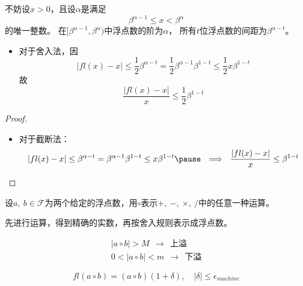 \begin{frame}\ft{\secname}

\begin{zhengming}
不妨设$x>0$，且设$\alpha$是满足
$$
\beta^{\alpha-1}\le x < \beta^{\alpha}
$$
的唯一整数。
在$[\beta^{\alpha-1}, \beta^{\alpha})$中浮点数的阶为$\alpha$，
所有$t$位浮点数的间距为$\beta^{\alpha-t}$。\pause 
\begin{itemize}
\item    
对于舍入法，因
$$
|fl(x)-x| \le \frac12 \beta^{\alpha-t} 
= \frac12 \beta^{\alpha-1}\beta^{1-t} \le \frac12 x \beta^{1-t} 
$$
故
$$
\frac{|fl(x)-x|}{x} \le \frac12 \beta^{1-t}
$$
\end{itemize}
\end{zhengming}
\end{frame}


\begin{frame}\ft{\secname}
\begin{proof}
\begin{itemize}
\item    
对于截断法：
$$
|fl(x)-x| \le  \beta^{\alpha-t} 
=  \beta^{\alpha-1}\beta^{1-t} \le  x \beta^{1-t} 
\pause ~~ \Longrightarrow~~
\frac{|fl(x)-x|}{x} \le  \beta^{1-t}
$$
\end{itemize}
\end{proof}

\end{frame}


\begin{frame}\ft{\secname}

设$a, ~b \in \mathcal{F}$为两个给定的浮点数，\textcolor{acolor4}{用$\circ$表示$+,~-,~\times,~/$中的任意一种运算。}
\begin{dingyi}[$fl(a\circ b)$]
先进行运算，得到精确的实数，再按舍入规则表示成浮点数。
\end{dingyi}
\pause
$$
\begin{array}{l}
|a \circ b| > M ~~\rightarrow~~ \mbox{上溢} \\[0.3cm]
0 < |a \circ b| < m ~~\rightarrow~~ \mbox{下溢} 
\end{array}
$$

\end{frame}


\begin{frame}\ft{\secname}

\begin{dingli}
$$
fl(a\circ b) = (a\circ b) (1+\delta), \quad |\delta| \le \epsilon_{machine}
$$
\end{dingli}

\end{frame}


